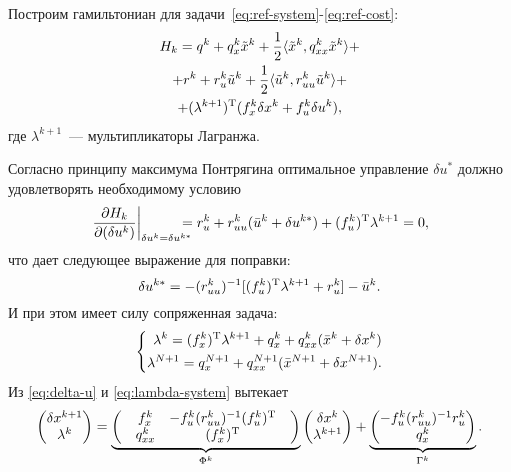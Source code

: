 \documentclass[../../doc.tex]{subfiles}
\begin{document}
    Построим гамильтониан для задачи~\eqref{eq:ref-system}-\eqref{eq:ref-cost}:
    \begin{multline}\label{eq:hamiltonian}
        H_k = q^{k} + q_x^{k}\tilde x^{k} + \frac{1}{2}\langle \tilde x^{k}, q_{xx}^{k}\tilde x^{k} \rangle
        +\\+
        r^{k} + r_u^{k}\tilde u^{k} + \frac{1}{2}\langle \tilde u^{k}, r_{uu}^{k}\tilde u^{k} \rangle
        +\\+
        (\lambda^{k+1})^\textnormal{T} (f_x^k \delta x^k + f_u^k \delta u^k),
    \end{multline}
    где $\lambda^{k+1}$~--- мультипликаторы Лагранжа.

    Согласно принципу максимума Понтрягина \cite{pontryagin1983} оптимальное управление $\delta u^{*}$ должно удовлетворять необходимому условию
    \begin{equation*}
        \left.\frac{\partial H_k}{\partial (\delta u^k)}\right|_{\delta u^k = \delta u^{k*}}
        \!\!\!\!\!\!=
        r_u^k + r_{uu}^k(\bar u^k + \delta u^{k*}) + (f_u^k)^\textnormal{T}\lambda^{k+1} = 0,
    \end{equation*}
    что дает следующее выражение для поправки:
    \begin{equation}\label{eq:delta-u}
        \delta u^{k*} = - (r_{uu}^k)^{-1}[(f_u^k)^\textnormal{T}\lambda^{k+1} + r_u^k] - \bar u^k.
    \end{equation}
    И при этом имеет силу сопряженная задача:
    \begin{equation}\label{eq:lambda-system}
        \left\{\begin{aligned}
            \lambda^k = (f_x^k)^\textnormal{T} \lambda^{k+1} + q_x^k + q_{xx}^k(\bar x^k + \delta x^k)
            \\
            \lambda^{N+1} = q_x^{N+1} + q_{xx}^{N+1}(\bar x^{N+1} + \delta x^{N+1})
            .
        \end{aligned}\right.
    \end{equation}
    Из \eqref{eq:delta-u} и \eqref{eq:lambda-system} вытекает
    \begin{equation}\label{eq:delta-x-lambda-system}
        \begin{pmatrix}
            \delta x^{k+1}
            \\
            \lambda^{k}
        \end{pmatrix}
        =
        \underbrace{\begin{pmatrix}
            & f_x^k & -f^k_u (r^k_{uu})^{-1} (f^k_u)^\textnormal{T} &
            \\
            & q^k_{xx} & (f^k_x)^\textnormal{T} &
        \end{pmatrix}}_{\Phi^k}
        \begin{pmatrix}
            \delta x^k
            \\
            \lambda^{k+1}
        \end{pmatrix}
        +
        \underbrace{\begin{pmatrix}
            -f^k_u (r^k_{uu})^{-1} r^k_u
            \\
            q^k_x
        \end{pmatrix}}_{\Gamma^k}.
    \end{equation}
\end{document}
